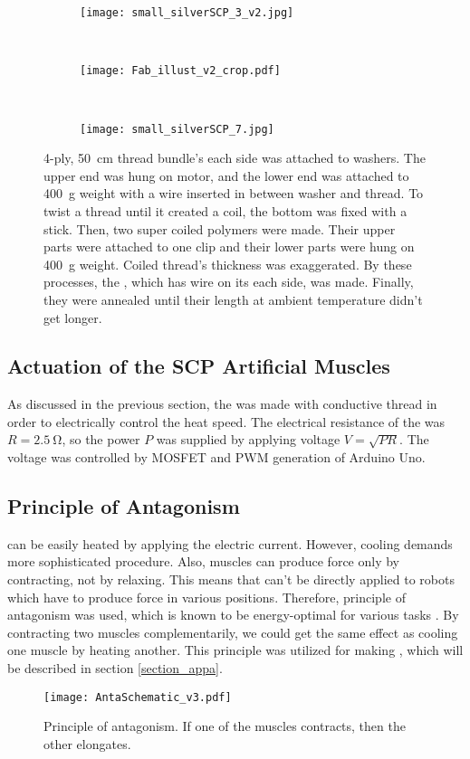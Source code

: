 \begin{figure}[b]
	\centering
	\begin{subfigure}{.15\linewidth}
		\centering\texttt{[image: small\_silverSCP\_3\_v2.jpg]}
		\caption{\label{silverSCP_2}}
	\end{subfigure}
	~
	\begin{subfigure}{.45\linewidth}
		\centering\texttt{[image: Fab\_illust\_v2\_crop.pdf]}
		\caption{\label{silverSCP_illust}}
	\end{subfigure}
	~
	\begin{subfigure}{.15\linewidth}
		\centering\texttt{[image: small\_silverSCP\_7.jpg]}
		\caption{\label{silverSCP_annealing}}
	\end{subfigure}
	\caption[Process of making \scps with silver-painted nylon thread]{ 4-ply, \SI{50}{\centi\meter} thread bundle's each side was attached to washers. The upper end was hung on motor, and the lower end was attached to \SI{400}{\gram} weight with a wire inserted in between washer and thread.  To twist a thread until it created a coil, the bottom was fixed with a stick. Then, two super coiled polymers were made. Their upper parts were attached to one clip and their lower parts were hung on \SI{400}{\gram} weight. Coiled thread's thickness was exaggerated.  By these processes, the \scpnospace, which has wire on its each side, was made. Finally, they were annealed until their length at ambient temperature didn't get longer.}
	\label{silverSCP_makingof}
\end{figure}

\subsection{Actuation of the SCP Artificial Muscles} \label{subsection_actuation}
As discussed in the previous section, the \scp was made with conductive thread in order to electrically control the heat speed. The electrical resistance of the \scp was $R=\SI{2.5}{\ohm}$, so the power $P$ was supplied by applying voltage $V=\sqrt{PR}$. The voltage was controlled by MOSFET and PWM generation of Arduino Uno.

\subsection{Principle of Antagonism} \label{subsection_anta}
\scps can be easily heated by applying the electric current. However, cooling demands more sophisticated procedure. Also, muscles can produce force only by contracting, not by relaxing. This means that \scps can't be directly applied to robots which have to produce force in various positions.
Therefore, principle of antagonism was used, which is known to be energy-optimal for various tasks \cite{antagonism}. 
By contracting two muscles complementarily, we could get the same effect as cooling one muscle by heating another. 
This principle was utilized for making \antanospace, which will be described in section \ref{section_appa}.

\begin{figure}[b]
	\centering
	\texttt{[image: AntaSchematic\_v3.pdf]}
	\caption[Principle of Antagonism.]{Principle of antagonism. If one of the muscles contracts, then the other elongates.}
	\label{antagonism}
\end{figure}

